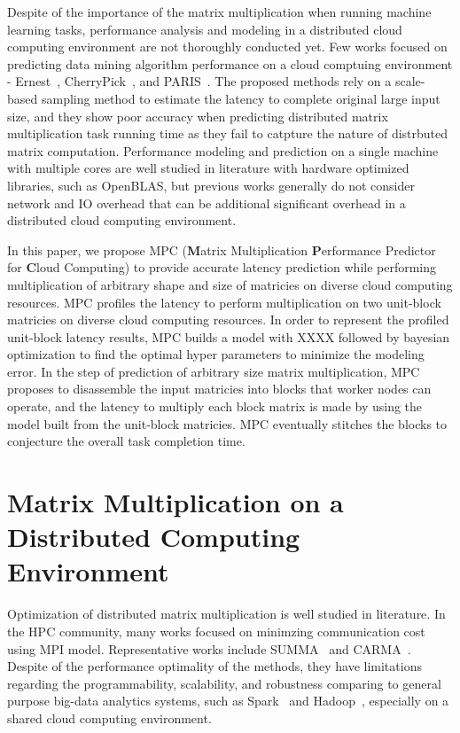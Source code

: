 \documentclass[10pt, conference, compsocconf]{IEEEtran}
\begin{document}
Despite of the importance of the matrix multiplication when running machine learning tasks, performance analysis and modeling in a distributed cloud computing environment are not thoroughly conducted yet. Few works focused on predicting data mining algorithm performance on a cloud comptuing environment - Ernest~\cite{ernest}, CherryPick~\cite{cherrypick}, and PARIS~\cite{paris}. The proposed methods rely on a scale-based sampling method to estimate the latency to complete original large input size, and they show poor accuracy when predicting distributed matrix multiplication task running time as they fail to catpture the nature of distrbuted matrix computation. Performance modeling and prediction on a single machine with multiple cores are well studied in literature with hardware optimized libraries, such as OpenBLAS, but previous works generally do not consider network and IO overhead that can be additional significant overhead in a distributed cloud computing environment.

In this paper, we propose MPC (\textbf{M}atrix Multiplication \textbf{P}erformance Predictor for \textbf{C}loud Computing) to provide accurate latency prediction while performing multiplication of arbitrary shape and size of matricies on diverse cloud computing resources. MPC profiles the latency to perform multiplication on two unit-block matricies on diverse cloud computing resources. In order to represent the profiled unit-block latency results, MPC builds a model with XXXX followed by bayesian optimization to find the optimal hyper parameters to minimize the modeling error. In the step of prediction of arbitrary size matrix multiplication, MPC proposes to disassemble the input matricies into blocks that worker nodes can operate, and the latency to multiply each block matrix is made by using the model built from the unit-block matricies. MPC eventually stitches the blocks to conjecture the overall task completion time.


\section{Matrix Multiplication on a Distributed Computing Environment}\label{sec:distributed-matrix-computation}
Optimization of distributed matrix multiplication is well studied in literature. In the HPC community, many works focused on minimzing communication cost using MPI model. Representative works include SUMMA~\cite{summa} and CARMA~\cite{carma}. Despite of the performance optimality of the methods, they have limitations regarding the programmability, scalability, and robustness comparing to general purpose big-data analytics systems, such as Spark~\cite{spark} and Hadoop~\cite{hadoop}, especially on a shared cloud computing environment.
\end{document}
